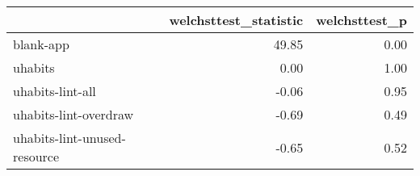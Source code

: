 \begin{tabular}{lrr}
\toprule
{} &  welchsttest\_statistic &  welchsttest\_p \\
\midrule
blank-app                    &                  49.85 &           0.00 \\
uhabits                      &                   0.00 &           1.00 \\
uhabits-lint-all             &                  -0.06 &           0.95 \\
uhabits-lint-overdraw        &                  -0.69 &           0.49 \\
uhabits-lint-unused-resource &                  -0.65 &           0.52 \\
\bottomrule
\end{tabular}
